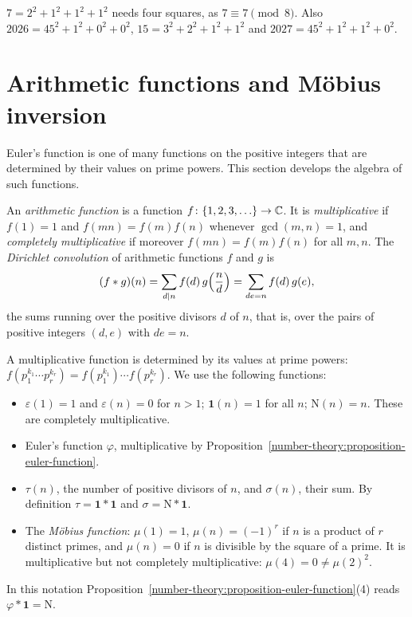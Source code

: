 \begin{example}\label{number-theory:example-four-squares}
$7 = 2^2 + 1^2 + 1^2 + 1^2$ needs four squares, as $7 \equiv 7 \pmod 8$. Also $2026 = 45^2 + 1^2 + 0^2 + 0^2$, $15 = 3^2 + 2^2 + 1^2 + 1^2$ and $2027 = 45^2 + 1^2 + 1^2 + 0^2$.
\end{example}

\section{Arithmetic functions and M\"obius inversion}\label{number-theory:section-arithmetic-functions}

Euler's function is one of many functions on the positive integers that are determined by their values on prime powers. This section develops the algebra of such functions.

\begin{definition}\label{number-theory:definition-arithmetic-function}
An \emph{arithmetic function} is a function $f \colon \{1, 2, 3, \ldots\} \to \mathbb{C}$. It is \emph{multiplicative} if $f(1) = 1$ and $f(mn) = f(m)f(n)$ whenever $\gcd(m, n) = 1$, and \emph{completely
multiplicative} if moreover $f(mn) = f(m)f(n)$ for all $m, n$. The \emph{Dirichlet convolution} of arithmetic functions $f$ and $g$ is
\[
(f * g)(n) = \sum_{d \mid n}f(d)\,g\Bigl(\frac{n}{d}\Bigr) = \sum_{de = n}f(d)\,g(e),
\]
the sums running over the positive divisors $d$ of $n$, that is, over the pairs of positive integers $(d, e)$ with $de = n$.
\end{definition}

A multiplicative function is determined by its values at prime powers: $f(p_1^{k_1} \cdots p_r^{k_r}) = f(p_1^{k_1}) \cdots f(p_r^{k_r})$. We use the following functions:
\begin{itemize}
\item $\varepsilon(1) = 1$ and $\varepsilon(n) = 0$ for $n > 1$; $\mathbf{1}(n) = 1$ for all $n$; $\mathrm{N}(n) = n$. These are completely multiplicative.
\item Euler's function $\varphi$, multiplicative by Proposition~\ref{number-theory:proposition-euler-function}.
\item $\tau(n)$, the number of positive divisors of $n$, and $\sigma(n)$, their sum. By definition $\tau = \mathbf{1} * \mathbf{1}$ and $\sigma = \mathrm{N} * \mathbf{1}$.
\item The \emph{M\"obius function}: $\mu(1) = 1$, $\mu(n) = (-1)^r$ if $n$ is a product of $r$ distinct primes, and $\mu(n) = 0$ if $n$ is divisible by the square of a prime. It is multiplicative but not
completely multiplicative: $\mu(4) = 0 \neq \mu(2)^2$.
\end{itemize}
In this notation Proposition~\ref{number-theory:proposition-euler-function}(4) reads $\varphi * \mathbf{1} = \mathrm{N}$.

